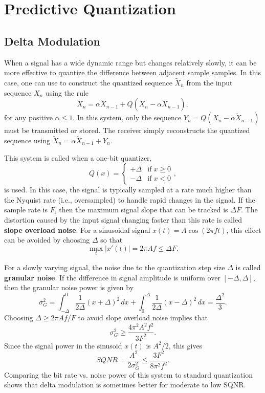 \section{Predictive Quantization}

\subsection{Delta Modulation}

When a signal has a wide dynamic range but changes relatively slowly, it can be more effective to quantize the difference between adjacent sample samples.
In this case, one can use  to construct the quantized sequence $\widetilde{X}_n$ from the input sequence $X_n$ using the rule
\[ \widetilde{X}_n = \alpha \widetilde{X}_{n-1} + Q \left( X_n - \alpha \widetilde{X}_{n-1} \right), \]
for any positive $\alpha \leq 1$.
In this system, only the sequence $Y_n = Q \left( X_n - \alpha \widetilde{X}_{n-1} \right)$ must be transmitted or stored.
The receiver simply reconstructs the quantized sequence using $\widetilde{X}_n = \alpha \widetilde{X}_{n-1} + Y_n$.

This system is called  when a one-bit quantizer,
\[ Q(x) = \begin{cases} +\Delta & \mathrm{if}\;x\geq 0 \\ -\Delta & \mathrm{if}\;x< 0 \end{cases}, \]
is used.
In this case, the signal is typically sampled at a rate much higher than the Nyquist rate (i.e., oversampled) to handle rapid changes in the signal.
If the sample rate is $F$, then the maximum signal slope that can be tracked is $\Delta F$.
The distortion caused by the input signal changing faster than this rate is called \textbf{slope overload noise}.
For a sinusoidal signal $x(t)=A \cos (2\pi f t)$, this effect can be avoided by choosing $\Delta$ so that
\[ \max_t \left| x'(t) \right| = 2\pi A f \leq \Delta F. \]

For a slowly varying signal, the noise due to the quantization step size $\Delta$ is called \textbf{granular noise}.
If the difference in signal amplitude is uniform over $[-\Delta,\Delta]$, then the granular noise power is given by
\[ \sigma^2_G = \int_{-\Delta}^{0} \frac{1}{2\Delta} (x+\Delta)^2 \, dx +  \int_{0}^{\Delta} \frac{1}{2\Delta} (x-\Delta)^2 \, dx = \frac{\Delta^2}{3}. \]
Choosing $\Delta \geq 2\pi A f / F$ to avoid slope overload noise implies that
\[ \sigma^2_G \geq \frac{4 \pi^2 A^2 f^2}{3  F^2} . \]
Since the signal power in the sinusoid $x(t)$ is $A^2 / 2$, this gives
\[ SQNR = \frac{A^2}{2\sigma^2_G} \leq \frac{3 F^2}{8 \pi^2 f^2}. \]
Comparing the bit rate vs. noise power of this system to standard quantization shows that delta modulation is sometimes better for moderate to low SQNR.

